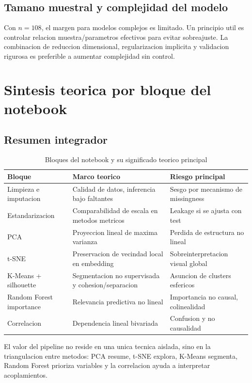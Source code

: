 \documentclass[12pt,a4paper,oneside]{report}
\begin{document}
\section{Tamano muestral y complejidad del modelo}

Con $n=108$, el margen para modelos complejos es limitado. Un principio util es controlar relacion muestra/parametros efectivos para evitar sobreajuste. La combinacion de reduccion dimensional, regularizacion implicita y validacion rigurosa es preferible a aumentar complejidad sin control.

\chapter{Sintesis teorica por bloque del notebook}

\section{Resumen integrador}

\begin{table}[H]
\centering
\caption{Bloques del notebook y su significado teorico principal}
\begin{tabular}{p{3.1cm}p{5.6cm}p{4.7cm}}
\toprule
Bloque & Marco teorico & Riesgo principal \\
\midrule
Limpieza e imputacion & Calidad de datos, inferencia bajo faltantes & Sesgo por mecanismo de missingness \\
Estandarizacion & Comparabilidad de escala en metodos metricos & Leakage si se ajusta con test \\
PCA & Proyeccion lineal de maxima varianza & Perdida de estructura no lineal \\
t-SNE & Preservacion de vecindad local en embedding & Sobreinterpretacion visual global \\
K-Means + silhouette & Segmentacion no supervisada y cohesion/separacion & Asuncion de clusters esfericos \\
Random Forest importance & Relevancia predictiva no lineal & Importancia no causal, colinealidad \\
Correlacion & Dependencia lineal bivariada & Confusion y no causalidad \\
\bottomrule
\end{tabular}
\end{table}

El valor del pipeline no reside en una unica tecnica aislada, sino en la triangulacion entre metodos: PCA resume, t-SNE explora, K-Means segmenta, Random Forest prioriza variables y la correlacion ayuda a interpretar acoplamientos.
\end{document}
